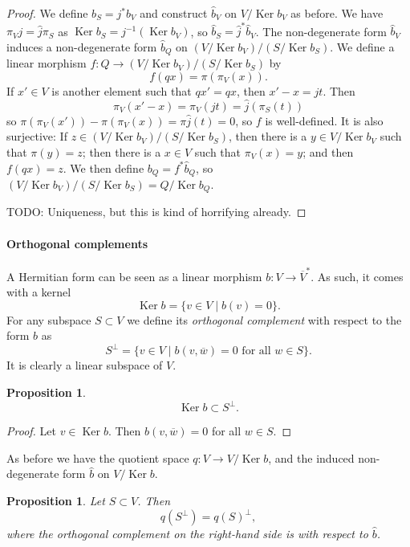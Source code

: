 \documentclass[10pt,a4paper]{article}
\newtheorem{prop}[theo]{Proposition}
\newtheorem*{proof}{Proof}
\def\ov#1{\overline{#1}}
\DeclareMathOperator{\Ker}{Ker}
\begin{document}
\begin{proof}
We define $b_S = j^*b_V$ and construct $\hat b_V$ on $V / \Ker b_V$ as before. We have $\pi_V j = \hat j \pi_S$ as $\Ker b_S = j^{-1}(\Ker b_V)$, so $\hat b_S = \hat j^* \hat b_V$. The non-degenerate form $\hat b_V$ induces a non-degenerate form $\hat b_Q$ on $(V / \Ker b_V) / (S / \Ker b_S)$. We define a linear morphism $f : Q \to (V / \Ker b_V) / (S / \Ker b_S)$ by
\[
f(qx) = \pi(\pi_V(x)).
\]
If $x' \in V$ is another element such that $qx' = qx$, then $x' - x = jt$. Then
\[
\pi_V(x' - x)
= \pi_V(jt)
= \hat j(\pi_S(t))
\]
so $\pi(\pi_V(x')) - \pi(\pi_V(x))
= \pi \hat j (t) = 0$, so $f$ is well-defined. It is also surjective: If $z \in (V / \Ker b_V) / (S / \Ker b_S)$, then there is a $y \in V / \Ker b_V$ such that $\pi(y) = z$; then there is a $x \in V$ such that $\pi_V(x) = y$; and then $f(qx) = z$. We then define $b_Q = f^* \hat b_Q$, so $(V / \Ker b_V) / (S / \Ker b_S) = Q / \Ker b_Q$.

TODO: Uniqueness, but this is kind of horrifying already.
\end{proof}


\paragraph{Orthogonal complements}

A Hermitian form can be seen as a linear morphism $b : V \to \ov V^*$. As such, it comes with a kernel
\[
\Ker b = \{ v \in V \mid b(v) = 0 \}.
\]
For any subspace $S \subset V$ we define its \emph{orthogonal complement} with respect to the form $b$ as
\[
S^\perp = \{ v \in V \mid b(v, \ov w) = 0 \text{ for all $w \in S$}\}.
\]
It is clearly a linear subspace of $V$.

\begin{prop}
\[
\Ker b \subset S^\perp.
\]
\end{prop}

\begin{proof}
Let $v \in \Ker b$. Then $b(v, \ov w) = 0$ for all $w \in S$.
\end{proof}


As before we have the quotient space $q : V \to V / \Ker b$, and the induced non-degenerate form $\hat b$ on $V / \Ker b$.

\begin{prop}
Let $S \subset V$. Then
\[
q(S^\perp) = q(S)^\perp,
\]
where the orthogonal complement on the right-hand side is with respect to $\hat b$.
\end{prop}
\end{document}
